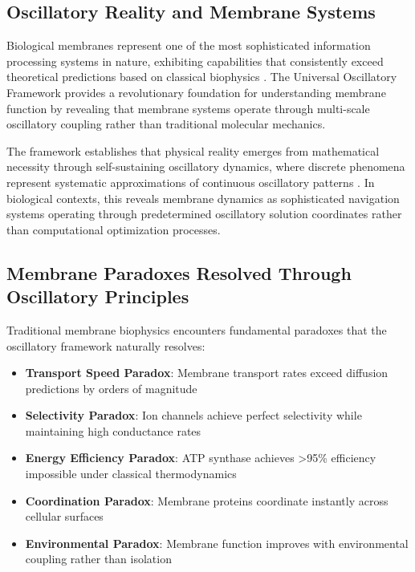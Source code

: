 \documentclass[12pt,a4paper]{article}
\begin{document}
\subsection{Oscillatory Reality and Membrane Systems}

Biological membranes represent one of the most sophisticated information processing systems in nature, exhibiting capabilities that consistently exceed theoretical predictions based on classical biophysics \cite{alberts2014molecular}. The Universal Oscillatory Framework \cite{sachikonye2024mathematical,sachikonye2024physical} provides a revolutionary foundation for understanding membrane function by revealing that membrane systems operate through multi-scale oscillatory coupling rather than traditional molecular mechanics.

The framework establishes that physical reality emerges from mathematical necessity through self-sustaining oscillatory dynamics, where discrete phenomena represent systematic approximations of continuous oscillatory patterns \cite{sachikonye2024mathematical}. In biological contexts, this reveals membrane dynamics as sophisticated navigation systems operating through predetermined oscillatory solution coordinates rather than computational optimization processes.

\subsection{Membrane Paradoxes Resolved Through Oscillatory Principles}

Traditional membrane biophysics encounters fundamental paradoxes that the oscillatory framework naturally resolves:

\begin{itemize}
\item \textbf{Transport Speed Paradox}: Membrane transport rates exceed diffusion predictions by orders of magnitude
\item \textbf{Selectivity Paradox}: Ion channels achieve perfect selectivity while maintaining high conductance rates
\item \textbf{Energy Efficiency Paradox}: ATP synthase achieves >95\% efficiency impossible under classical thermodynamics
\item \textbf{Coordination Paradox}: Membrane proteins coordinate instantly across cellular surfaces
\item \textbf{Environmental Paradox}: Membrane function improves with environmental coupling rather than isolation
\end{itemize}
\end{document}
